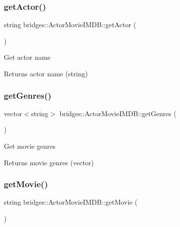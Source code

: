 \subsubsection{\texorpdfstring{get\+Actor()}{getActor()}}
{\footnotesize\ttfamily string bridges\+::\+Actor\+Movie\+I\+M\+D\+B\+::get\+Actor (\begin{DoxyParamCaption}{ }\end{DoxyParamCaption})\hspace{0.3cm}{\ttfamily [inline]}}

Get actor name

\begin{DoxyReturn}{Returns}
actor name (string) 
\end{DoxyReturn}
\mbox{\label{classbridges_1_1_actor_movie_i_m_d_b_a5d768342eb18fbf65cd6c20b73b93b6c}} 
\subsubsection{\texorpdfstring{get\+Genres()}{getGenres()}}
{\footnotesize\ttfamily vector$<$string$>$ bridges\+::\+Actor\+Movie\+I\+M\+D\+B\+::get\+Genres (\begin{DoxyParamCaption}{ }\end{DoxyParamCaption})\hspace{0.3cm}{\ttfamily [inline]}}

Get movie genres

\begin{DoxyReturn}{Returns}
movie genres (vector) 
\end{DoxyReturn}
\mbox{\label{classbridges_1_1_actor_movie_i_m_d_b_ae35c9a5c7ba79538f050e8009ddba786}} 
\subsubsection{\texorpdfstring{get\+Movie()}{getMovie()}}
{\footnotesize\ttfamily string bridges\+::\+Actor\+Movie\+I\+M\+D\+B\+::get\+Movie (\begin{DoxyParamCaption}{ }\end{DoxyParamCaption})\hspace{0.3cm}{\ttfamily [inline]}}

